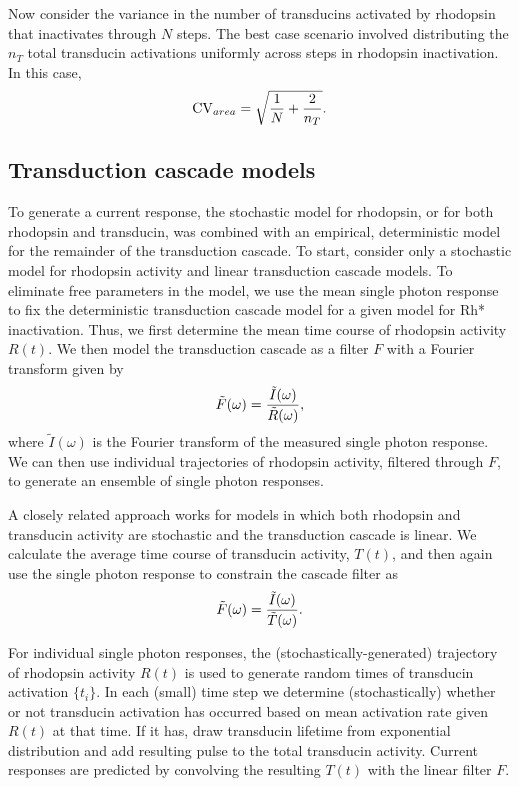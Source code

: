 \documentclass[12pt]{article}
\begin{document}
Now consider the variance in the number of transducins activated by rhodopsin that inactivates through $N$ steps.  The best case scenario involved distributing the $n_T$ total transducin activations uniformly across steps in rhodopsin inactivation.  In this case, \begin{equation}
{\rm CV}_{area}  = \sqrt{{1 \over N} + {2 \over n_T}}.
\end{equation}

\subsection{Transduction cascade models}

To generate a current response, the stochastic model for rhodopsin, or for both rhodopsin and transducin, was combined with an empirical, deterministic model for the remainder of the transduction cascade.  To start, consider only a stochastic model for rhodopsin activity and linear transduction cascade models.  To eliminate free parameters in the model, we use the mean single photon response to fix the deterministic transduction cascade model for a given model for Rh* inactivation.  Thus, we first determine the mean time course of rhodopsin activity $R(t)$.  We then model the transduction cascade as a filter $F$ with a Fourier transform given by
\begin{equation}
\tilde F(\omega) = {{\tilde I(\omega)} \over {\tilde R(\omega)}},
\label{eq:linear-trans}
\end{equation}
where $\tilde I(\omega)$ is the Fourier transform of the measured single photon response.  We can then use individual trajectories of rhodopsin activity, filtered through $F$, to generate an ensemble of single photon responses.

A closely related approach works for models in which both rhodopsin and transducin activity are stochastic and the transduction cascade is linear.  We calculate the average time course of transducin activity, $T(t)$, and then again use the single photon response to constrain the cascade filter as 
\begin{equation}
\tilde F(\omega) = {{\tilde I(\omega)} \over {\tilde T(\omega)}}.
\end{equation}

For individual single photon responses, the (stochastically-generated) trajectory of rhodopsin activity $R(t)$ is used to generate random times of transducin activation $\{t_i\}$.  In each (small) time step we determine (stochastically) whether or not transducin activation has occurred based on mean activation rate given $R(t)$ at that time.  If it has, draw transducin lifetime from exponential distribution and add resulting pulse to the total transducin activity.  Current responses are predicted by convolving the resulting $T(t)$ with the linear filter $F$.  
\end{document}
